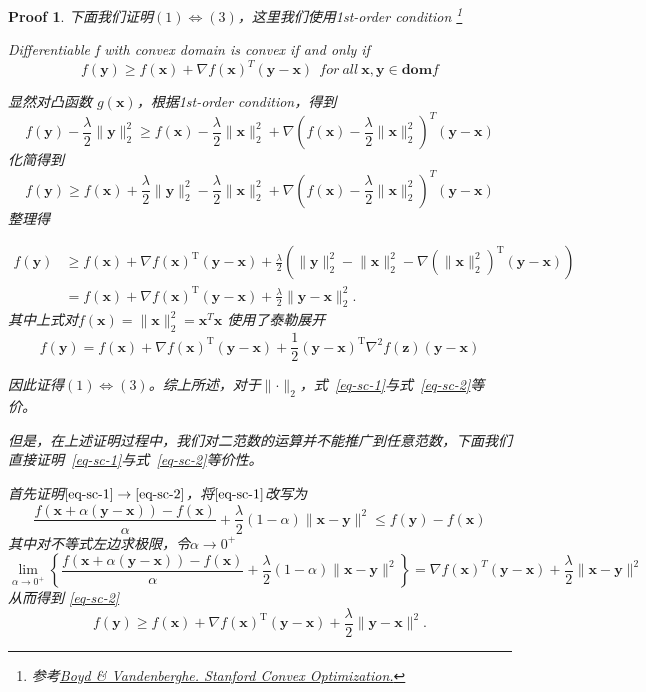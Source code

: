 \documentclass[a4paper,UTF8]{article}
\numberwithin{equation}{section}
\newtheorem*{myProof}{Proof}
\begin{document}
\begin{myProof}
\newpage
下面我们证明$(1) \Leftrightarrow (3)$，这里我们使用1st-order condition \footnote{参考\href{https://see.stanford.edu/materials/lsocoee364a/03convexfunctions.pdf}{Boyd \& Vandenberghe. Stanford Convex Optimization.}} 

\begin{prop-box}
 Differentiable f with convex domain is convex if and only if 
\[ f( \mathbf{y}) \geq f( \mathbf{x}) + \nabla f( \mathbf{x})^T( \mathbf{y}- \mathbf{x}) ~~for ~all ~\mathbf{x}, \mathbf{y} \in \mathbf{dom} f \]
 \end{prop-box}
 
显然对凸函数 $g( \mathbf{x}) $，根据1st-order condition，得到
\[ f(\mathbf{y}) - \frac{\lambda}{2} \lVert \mathbf{y} \rVert ^2_2 \geq  f(\mathbf{x}) - \frac{\lambda}{2} \lVert \mathbf{x} \rVert ^2_2 + \nabla (f(\mathbf{x}) - \frac{\lambda}{2} \lVert \mathbf{x} \rVert ^2_2)^T (  \mathbf{y} - \mathbf{x}) \]
化简得到
\[ f(\mathbf{y}) \geq f(\mathbf{x}) + \frac{\lambda}{2} \lVert \mathbf{y} \rVert ^2_2 - \frac{\lambda}{2} \lVert \mathbf{x} \rVert ^2_2 + \nabla (f(\mathbf{x}) - \frac{\lambda}{2} \lVert \mathbf{x} \rVert ^2_2)^T (  \mathbf{y} - \mathbf{x}) \]
整理得

\begin{align*}
f(\mathbf{y}) &\geq f(\mathbf{x}) + \nabla f(\mathbf{x})^\mathrm{T}(\mathbf{y}-\mathbf{x}) + \frac{\lambda}{2}(\lVert \mathbf{y} \rVert ^2_2 - \lVert \mathbf{x} \rVert ^2_2  - \nabla (\lVert \mathbf{x} \rVert ^2_2)^\mathrm{T}(\mathbf{y}-\mathbf{x})  )  \\
& = f(\mathbf{x}) + \nabla f(\mathbf{x})^\mathrm{T}(\mathbf{y}-\mathbf{x}) + \frac{\lambda}{2}\lVert \mathbf{y} - \mathbf{x}\rVert^2_2. 
\end{align*} 
其中上式对$f(\mathbf{x}) = \rVert \mathbf{x} \rVert ^2_2 =\mathbf{x}^T \mathbf{x} $ 使用了泰勒展开
\[ f(\mathbf{y}) = f(\mathbf{x}) + \nabla f(\mathbf{x})^\mathrm{T} (\mathbf{y}-\mathbf{x}) + \frac{1}{2}(\mathbf{y}-\mathbf{x})^\mathrm{T} \nabla^2f(\mathbf{z})(\mathbf{y}-\mathbf{x}) \] 

因此证得$(1) \Leftrightarrow (3)$。综上所述，对于$\lVert  \cdot \rVert_2$，式~\eqref{eq-sc-1}与式~\eqref{eq-sc-2}等价。



但是，在上述证明过程中，我们对二范数的运算并不能推广到任意范数，下面我们直接证明~\eqref{eq-sc-1}与式~\eqref{eq-sc-2}等价性。


首先证明$\eqref{eq-sc-1} \to \eqref{eq-sc-2} $，将$\eqref{eq-sc-1} $改写为
\[ \frac{f(\mathbf{x} + \alpha (\mathbf{y} - \mathbf{x})) - f(\mathbf{x})}{\alpha} + \frac{\lambda}{2}(1-\alpha)\lVert \mathbf{x} - \mathbf{y}\rVert^2 \leq f(\mathbf{y}) - f(\mathbf{x}) \]
其中对不等式左边求极限，令$\alpha \to 0^+$
\[ \lim_{\alpha \to 0^+} \left\{\frac{f(\mathbf{x} + \alpha (\mathbf{y} - \mathbf{x})) - f(\mathbf{x})}{\alpha}  +\frac{\lambda}{2}(1-\alpha)\lVert \mathbf{x} - \mathbf{y}\rVert^2 \right\} =   \nabla f(\mathbf{x} )^T (\mathbf{y} - \mathbf{x}) + \frac{\lambda}{2} \lVert \mathbf{x}  - \mathbf{y}\rVert^2\]
从而得到 \eqref{eq-sc-2}
\[ f(\mathbf{y}) \geq f(\mathbf{x}) + \nabla f(\mathbf{x})^\mathrm{T}(\mathbf{y}-\mathbf{x}) + \frac{\lambda}{2}\lVert \mathbf{y} - \mathbf{x}\rVert^2. \]


\end{myProof}
\end{document}
